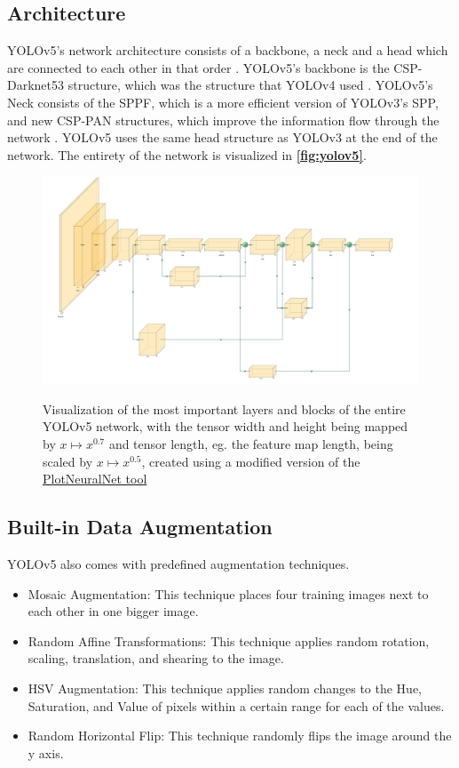 \documentclass[10pt]{book}
\newcommand{\figureref}[1]{\textbf{\autoref{#1}}}
\begin{document}
\subsection{Architecture}

\ac{YOLO}v5's network architecture consists of a backbone, a neck and a head which are connected to each other in that order \cite{jani2023model}. \ac{YOLO}v5's backbone is the CSP-Darknet53 structure, which was the structure that \ac{YOLO}v4 used \cite{bochkovskiy2020yolov4}. \ac{YOLO}v5's Neck consists of the SPPF, which is a more efficient version of \ac{YOLO}v3's \ac{SPP}, and new \ac{CSP-PAN} structures, which improve the information flow through the network \cite{liu2018path}. \ac{YOLO}v5 uses the same head structure as \ac{YOLO}v3 at the end of the network. The entirety of the network is visualized in \figureref{fig:yolov5}.

\begin{figure}
  \caption{Visualization of the most important layers and blocks of the entire \ac{YOLO}v5 network, with the tensor width and height being mapped by $x \mapsto x^{0.7}$ and tensor length, eg. the feature map length, being scaled by $x \mapsto x^{0.5}$, created using a modified version of the \href{https://github.com/jnccd/PlotNeuralNet}{PlotNeuralNet tool} \cite{haris_iqbal_2018_2526396}}
  \includegraphics[width=\textwidth]{image/yolov5}
  \label{fig:yolov5}
\end{figure}

\subsection{Built-in Data Augmentation}

\ac{YOLO}v5 also comes with predefined augmentation techniques. 

\begin{itemize}
  \item Mosaic Augmentation: This technique places four training images next to each other in one bigger image.
  \item Random Affine Transformations: This technique applies random rotation, scaling, translation, and shearing to the image.
  \item HSV Augmentation: This technique applies random changes to the Hue, Saturation, and Value of pixels within a certain range for each of the values.
  \item Random Horizontal Flip: This technique randomly flips the image around the y axis.
\end{itemize}
\end{document}
